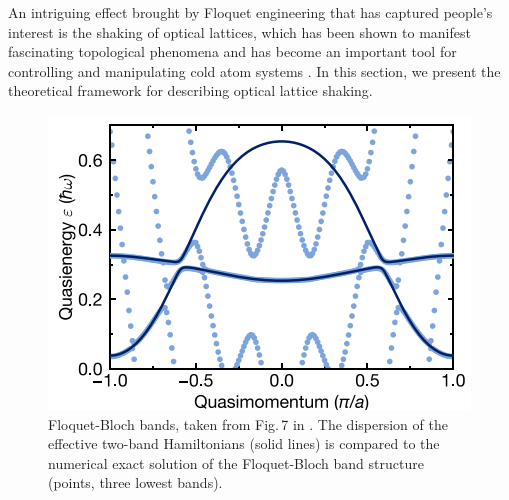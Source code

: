 \documentclass[reprint, amsmath, amssymb, aps]{revtex4-2}
\begin{document}
An intriguing effect brought by Floquet engineering that has captured people's interest is the shaking of optical lattices, which has been shown to manifest fascinating topological phenomena  \cite{12n, 16,17,18,19} and has become an important tool for controlling and manipulating cold atom systems \cite{15,24,25}. In this section, we present the theoretical framework for describing optical lattice shaking. \\

\begin{figure}
\includegraphics[scale=0.85]{F5}
\caption{Floquet-Bloch bands, taken from Fig.\,7 in \cite{Sandholzer}. The dispersion of the effective two-band Hamiltonians (solid lines) is compared to the numerical exact solution of the Floquet-Bloch band structure (points, three lowest bands). }
\end{figure}
\end{document}
